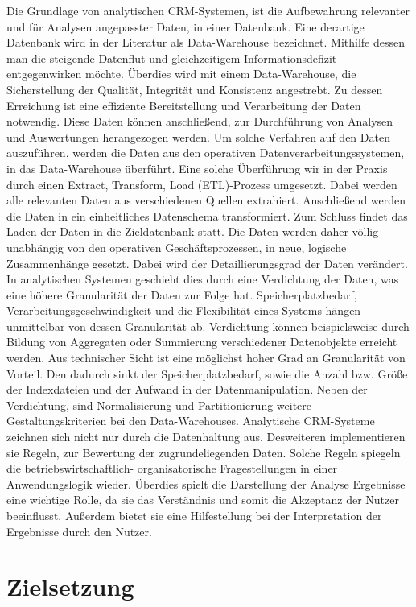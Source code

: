Die Grundlage von analytischen CRM-Systemen, ist die Aufbewahrung relevanter und für Analysen angepasster Daten, in einer Datenbank. Eine derartige Datenbank wird in der Literatur als Data-Warehouse bezeichnet. Mithilfe dessen man die steigende Datenflut und gleichzeitigem Informationsdefizit entgegenwirken möchte. Überdies wird mit einem Data-Warehouse, die Sicherstellung der Qualität, Integrität und Konsistenz angestrebt. Zu dessen Erreichung ist eine effiziente Bereitstellung und Verarbeitung der Daten notwendig. Diese Daten können anschließend, zur Durchführung von Analysen und Auswertungen herangezogen werden. Um solche Verfahren auf den Daten auszuführen, werden die Daten aus den operativen Datenverarbeitungssystemen, in das Data-Warehouse überführt. Eine solche Überführung wir in der Praxis durch einen Extract, Transform, Load (ETL)-Prozess umgesetzt. Dabei werden alle relevanten Daten aus verschiedenen Quellen extrahiert. Anschließend werden die Daten in ein einheitliches Datenschema transformiert. Zum Schluss findet das Laden der Daten in die Zieldatenbank statt. 
Die Daten werden daher völlig unabhängig von den operativen Geschäftsprozessen, in neue, logische Zusammenhänge gesetzt. Dabei wird der Detaillierungsgrad der Daten verändert. In analytischen Systemen geschieht dies durch eine Verdichtung der Daten, was eine höhere Granularität der Daten zur Folge hat. Speicherplatzbedarf,  Verarbeitungsgeschwindigkeit und die Flexibilität eines Systems hängen unmittelbar von dessen Granularität ab. Verdichtung können beispielsweise durch Bildung von Aggregaten oder Summierung verschiedener Datenobjekte erreicht werden. Aus technischer Sicht ist eine möglichst hoher Grad an Granularität von Vorteil. Den dadurch sinkt der Speicherplatzbedarf, sowie die Anzahl bzw. Größe der Indexdateien und der Aufwand in der Datenmanipulation. Neben der Verdichtung, sind Normalisierung und Partitionierung weitere Gestaltungskriterien bei den Data-Warehouses. Analytische CRM-Systeme zeichnen sich nicht nur durch die Datenhaltung aus. Desweiteren implementieren sie Regeln, zur Bewertung der zugrundeliegenden Daten. Solche Regeln spiegeln die betriebswirtschaftlich-
organisatorische Fragestellungen in einer Anwendungslogik wieder. Überdies spielt die Darstellung der Analyse Ergebnisse eine wichtige Rolle, da sie das Verständnis und somit die Akzeptanz der Nutzer beeinflusst. Außerdem bietet sie eine Hilfestellung bei der Interpretation der Ergebnisse durch den Nutzer.

\section{Zielsetzung}

